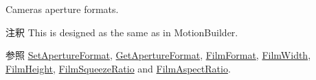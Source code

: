 Camera\textquotesingle{}s aperture formats. \begin{DoxyRemark}{注釈}
This is designed as the same as in Motion\+Builder. 
\end{DoxyRemark}
\begin{DoxySeeAlso}{参照}
\hyperlink{class_fbx_camera_a5b644b41e4d72c214acfdb5a2dee7576}{Set\+Aperture\+Format}, \hyperlink{class_fbx_camera_a33f198a1cb447a1e1e41d69856a7291c}{Get\+Aperture\+Format}, \hyperlink{class_fbx_camera_a49ebaef59ee49281225e2d0652894a4f}{Film\+Format}, \hyperlink{class_fbx_camera_a54f69a2e295c3c69df559f9b64699be5}{Film\+Width}, \hyperlink{class_fbx_camera_ae8e2abec912de996c4eaaff987a3bd17}{Film\+Height}, \hyperlink{class_fbx_camera_a21d8a100a10638aafdbf69304c651c48}{Film\+Squeeze\+Ratio} and \hyperlink{class_fbx_camera_aeefc9d0c4a6c9c3e17dc265cf2621a47}{Film\+Aspect\+Ratio}. 
\end{DoxySeeAlso}
